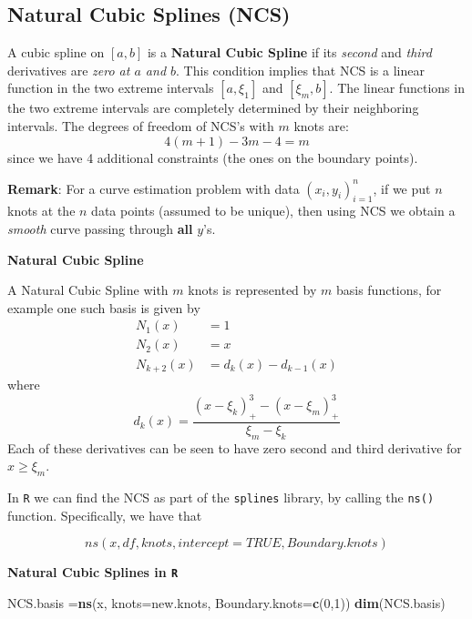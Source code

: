 \documentclass[
]{book}
\newenvironment{Shaded}{\begin{snugshade}}{\end{snugshade}}
\newcommand{\AttributeTok}[1]{\textcolor[rgb]{0.13,0.29,0.53}{#1}}
\newcommand{\DecValTok}[1]{\textcolor[rgb]{0.00,0.00,0.81}{#1}}
\newcommand{\FunctionTok}[1]{\textcolor[rgb]{0.13,0.29,0.53}{\textbf{#1}}}
\newcommand{\NormalTok}[1]{#1}
\newcommand{\OtherTok}[1]{\textcolor[rgb]{0.56,0.35,0.01}{#1}}
\begin{document}
\subsection{Natural Cubic Splines (NCS)}\label{natural-cubic-splines-ncs}

A cubic spline on \([a, b]\) is a \textbf{Natural Cubic Spline} if its \emph{second} and \emph{third} derivatives are \emph{zero at \(a\) and \(b\)}. This condition implies that NCS is a linear function in the two extreme intervals \([a,\xi_1]\) and \([\xi_m,b]\). The linear functions in the two extreme intervals are completely determined by their neighboring intervals. The degrees of freedom of NCS's with \(m\) knots are:
\[4(m+1)-3m -4=m\]
since we have 4 additional constraints (the ones on the boundary points).

\textbf{Remark}: For a curve estimation problem with data \((x_i,y_i)^n_{i=1}\), if we put \(n\) knots at the \(n\) data points (assumed to be unique), then using NCS we obtain a \emph{smooth} curve passing through \textbf{all} \(y\)'s.

\textbf{Natural Cubic Spline}

A Natural Cubic Spline with \(m\) knots is represented by \(m\) basis functions, for example one such basis is given by
\begin{align*}
 N_1(x) &= 1\\
 N_2(x) &= x\\
 N_{k+2} (x) &= d_k(x) - d_{k-1}(x)
 \end{align*}
where
\[d_k(x) = \frac{(x-\xi_k)_{+}^{3} - (x-\xi_{m})_{+}^{3}}{\xi_m - \xi_k}\]
Each of these derivatives can be seen to have zero second and third derivative for \(x\geq \xi_m\).

In \texttt{R} we can find the NCS as part of the \texttt{splines} library, by calling the \texttt{ns()} function. Specifically, we have that

\[ ns(x, df, knots, intercept=TRUE, Boundary.knots) \]

\textbf{Natural Cubic Splines in \texttt{R}}

\begin{Shaded}
\begin{Highlighting}[]
\NormalTok{NCS.basis }\OtherTok{=}\FunctionTok{ns}\NormalTok{(x, }\AttributeTok{knots=}\NormalTok{new.knots, }\AttributeTok{Boundary.knots=}\FunctionTok{c}\NormalTok{(}\DecValTok{0}\NormalTok{,}\DecValTok{1}\NormalTok{))}
\FunctionTok{dim}\NormalTok{(NCS.basis)}
\end{Highlighting}
\end{Shaded}
\end{document}
